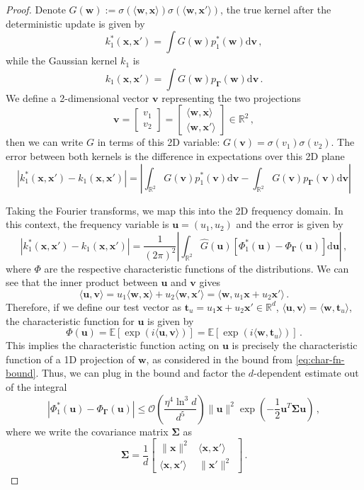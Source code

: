 \begin{proof}
    Denote $G(\bm w) := \sigma(\langle \bm w, \bm x\rangle) \sigma(\langle \bm w, \bm x'\rangle)$, the true kernel after the deterministic update is given by
    \[
        k_1^*(\bm x, \bm x') = \int G(\bm w) p_1^*(\bm w) \mathrm d \bm v\, ,
    \]
    while the Gaussian kernel $k_1$ is
    \[
        k_1(\bm x, \bm x') = \int G(\bm w) p_{\bm \Gamma}(\bm w) \mathrm d \bm v\, .
    \]
    We define a 2-dimensional vector $\bm{v}$ representing the two projections
    \[
        \bm{v} = \begin{bmatrix} v_1 \\ v_2 \end{bmatrix} = \begin{bmatrix} \langle \bm{w}, \bm{x} \rangle \\ \langle \bm{w}, \bm{x}' \rangle \end{bmatrix} \in \mathbb{R}^2\, ,
    \]
    then we can write $G$ in terms of this 2D variable: $G(\bm{v}) = \sigma(v_1)\sigma(v_2)$. The error between both kernels is the difference in expectations over this 2D plane
    \[
        |k_1^*(\bm x, \bm x') - k_1(\bm x, \bm x')| = \left| \int_{\mathbb{R}^2} G(\bm{v}) p_1^*(\bm{v}) \mathrm d\bm{v} - \int_{\mathbb{R}^2} G(\bm{v}) p_{\bm \Gamma}(\bm{v}) \mathrm d\bm{v} \right|
    \]
    
    Taking the Fourier transforms, we map this into the 2D frequency domain. In this context, the frequency variable is $\bm{u} = (u_1, u_2)$ and the error is given by
    \[
        |k_1^*(\bm x, \bm x') - k_1(\bm x, \bm x')| = \frac{1}{(2\pi)^2} \left| \int_{\mathbb{R}^2} \hat{G}(\bm{u}) [\Phi_1^*(\bm{u}) - \Phi_{\bm \Gamma}(\bm{u})] \mathrm d\bm{u} \right|\, ,
    \]
    where $\Phi$ are the respective characteristic functions of the distributions. We can see that the inner product between $\bm u$ and $\bm v$ gives
    \[
        \langle \bm u, \bm v\rangle = u_1 \langle \bm w, \bm x\rangle + u_2 \langle \bm w, \bm x'\rangle = \langle \bm w, u_1 \bm x + u_2 \bm x' \rangle\, .
    \]
    Therefore, if we define our test vector as $\bm t_u = u_1 \bm x + u_2 \bm x' \in \mathbb R^d$, $\langle \bm u, \bm v\rangle = \langle \bm w, \bm t_u\rangle$, the characteristic function for $\bm u$ is given by
    \[
        \Phi(\bm u) = \mathbb E[\exp(i \langle \bm u, \bm v\rangle)] = \mathbb E[\exp(i \langle \bm w, \bm t_u \rangle)]\, .
    \]
    This implies the characteristic function acting on $\bm u$ is precisely the characteristic function of a 1D projection of $\bm w$, as considered in the bound from \cref{eq:char-fn-bound}. Thus, we can plug in the bound and factor the $d$-dependent estimate out of the integral
    \[
        |\Phi_1^*(\bm{u}) - \Phi_{\bm \Gamma}(\bm{u})| \leq \mathcal{O}\left(\frac{\eta^4\ln^3 d}{d^5}\right) \|\bm{u}\|^2 \exp\left(-\frac{1}{2}\bm{u}^T \bm \Sigma \bm{u}\right) \, ,
    \]
    where we write the covariance matrix $\bm \Sigma$ as
    \[
        \bm \Sigma = \frac{1}{d}\begin{bmatrix}
            \|\bm x\|^2 & \langle \bm x, \bm x' \rangle\\
            \langle \bm x, \bm x' \rangle & \|\bm x'\|^2
        \end{bmatrix}\, .
    \]
    

\end{proof}

